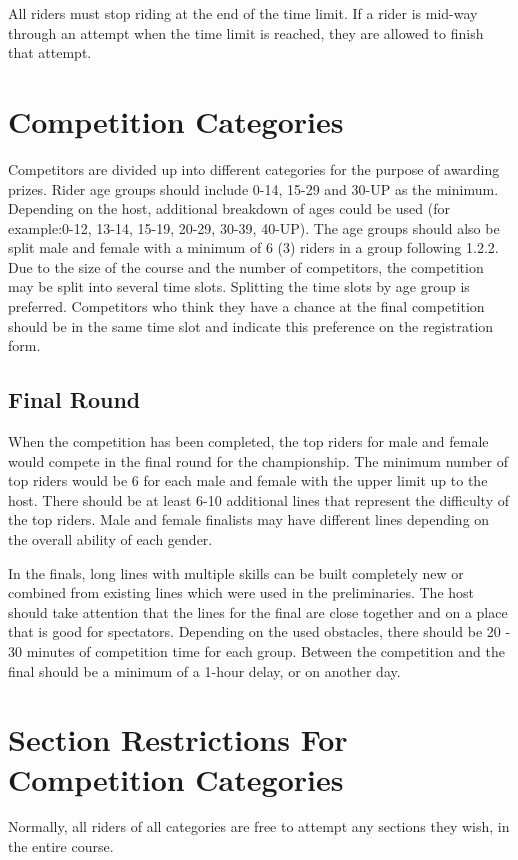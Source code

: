 All riders must stop riding at the end of the time limit. 
If a rider is mid-way through an attempt when the time limit is reached, they are allowed to finish that attempt.

\section{Competition Categories}
Competitors are divided up into different categories for the purpose of awarding prizes. 
Rider age groups should include 0-14, 15-29 and 30-UP as the minimum. 
Depending on the host, additional breakdown of ages could be used (for example:0-12, 13-14, 15-19, 20-29, 30-39, 40-UP). 
The age groups should also be split male and female with a minimum of 6 (3) riders in a group following 1.2.2. 
Due to the size of the course and the number of competitors, the competition may be split into several time slots. 
Splitting the time slots by age group is preferred. 
Competitors who think they have a chance at the final competition should be in the same time slot and indicate this preference on the registration form.

\subsection{Final Round}
When the competition has been completed, the top riders for male and female would compete in the final round for the championship. The minimum number of top riders would be 6 for each male and female with the upper limit up to the host. 
There should be at least 6-10 additional lines that represent the difficulty of the top riders. 
Male and female finalists may have different lines depending on the overall ability of each gender.

In the finals, long lines with multiple skills can be built completely new or combined from existing lines which were used in the preliminaries. 
The host should take attention that the lines for the final are close together and on a place that is good for spectators. Depending on the used obstacles, there should be 20 - 30 minutes of competition time for each group. 
Between the competition and the final should be a minimum of a 1-hour delay, or on another day.
 
\section{Section Restrictions For Competition Categories \label{sec:trials_section-restrictions-for-competition-categories}}
Normally, all riders of all categories are free to attempt any sections they wish, in the entire course.

